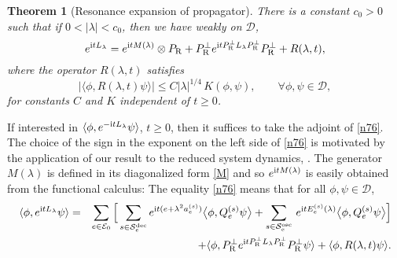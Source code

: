 \documentclass[letterpaper,onecolumn,11pt,accepted=2021-12-09]{quantumarticle}
\numberwithin{equation}{section}
\newcounter{resultcounter}[section]
\newtheorem{thm}[resultcounter]{Theorem}
\newcommand{\aes}{a_e^{(s)}}
\newcommand{\Qes}{Q_e^{(s)}}
\newcommand{\Ees}{E_e^{(s)}(\lambda)}
\renewcommand{\r}{{\rm R}}
\renewcommand{\i}{{\rm i}}
\begin{document}
\begin{thm}[Resonance expansion of propagator]
\label{motherthm}
There is a constant $c_0>0$ such that if  $0<|\lambda|< c_0$, then we have weakly on ${\mathcal D}$,  
\begin{equation}
e^{\i tL_\lambda} = e^{\i t M(\lambda)}\otimes P_\r + P^\perp_\r e^{\i t P^\perp_\r L_\lambda P^\perp_\r} P^\perp_\r +R(\lambda,t), 
	\label{n76}
\end{equation}
where the operator $R(\lambda,t)$ satisfies
\begin{equation}
\big|\langle \phi , R(\lambda,t) \psi\rangle \big|\le C |\lambda|^{1/4} \, K(\phi,\psi), \qquad \forall \phi,\psi\in{\mathcal D},
\label{31.1}
\end{equation}
for constants $C$ and $K$ independent of $t\ge0$. 
\end{thm}
If interested in $\langle\phi, e^{-\i tL_\lambda}\psi\rangle$, $t\ge0$, then it suffices to take the adjoint of \eqref{n76}. The choice of the sign in the exponent on the left side of \eqref{n76} is motivated by the application of our result to the reduced system dynamics, \cite{Markov2}. The generator $M(\lambda)$ is defined in its diagonalized form \eqref{M} and so $e^{\i t M(\lambda)}$ is easily obtained from the functional calculus: The equality \eqref{n76} means that for all $\phi,\psi\in{\mathcal D}$,
\begin{eqnarray}
\langle\phi, e^{\i tL_\lambda}\psi\rangle  &=& \sum_{e\in{\mathcal E}_0} \Big[ \sum_{s\in{\mathcal S}_e^{\rm dec}} e^{\i t (e+\lambda^2 \aes)} \big\langle\phi, \Qes\psi\big\rangle + \sum_{s\in{\mathcal S}_e^{\rm osc}}  \, e^{\i t \Ees}\big\langle \phi, \Qes\psi\big\rangle\Big]\nonumber\\
&&+\langle \phi, P^\perp_\r e^{\i t P^\perp_\r L_\lambda P^\perp_\r} P^\perp_\r \psi\rangle  +\langle\phi, R(\lambda,t)\psi\rangle.
\label{76.1.1.1}
\end{eqnarray}
\end{document}
